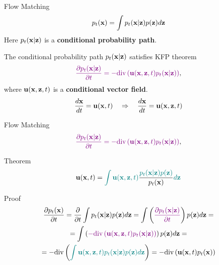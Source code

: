 \begin{frame}{Flow Matching}
	\[
		p_t(\mathbf{x}) = \int p_t(\mathbf{x} | \mathbf{z}) p(\mathbf{z}) d \mathbf{z} 
	\]
	Here $p_t(\mathbf{x} | \mathbf{z})$ is a \textbf{conditional probability path}.
	
	The conditional probability path $p_t(\mathbf{x} | \mathbf{z})$ satisfies KFP theorem
	\[
		{\color{violet}\frac{\partial p_t(\mathbf{x} | \mathbf{z})}{\partial t} = - \text{div}\left(\mathbf{u}(\mathbf{x}, \mathbf{z}, t) p_t(\mathbf{x} | \mathbf{z})\right)},
	\]
	where $\mathbf{u}(\mathbf{x}, \mathbf{z}, t)$ is a \textbf{conditional vector field}.
	\[
		\frac{d\mathbf{x}}{dt} = \mathbf{u}(\mathbf{x}, t) \quad \Rightarrow \quad \frac{d\mathbf{x}}{dt} = \mathbf{u}(\mathbf{x}, \mathbf{z}, t)
	\]
	\vspace{-0.3cm}
\end{frame}
\begin{frame}{Flow Matching}
	\[
		{\color{violet}\frac{\partial p_t(\mathbf{x} | \mathbf{z})}{\partial t} = - \text{div}\left(\mathbf{u}(\mathbf{x}, \mathbf{z}, t) p_t(\mathbf{x} | \mathbf{z})\right)},
	\]
	\begin{block}{Theorem}
		\vspace{-0.3cm}
		\[
			\mathbf{u}(\mathbf{x}, t) = {\color{teal}\int \mathbf{u}(\mathbf{x}, \mathbf{z}, t)} \frac{\color{teal}p_t(\mathbf{x} | \mathbf{z}) p(\mathbf{z})}{p_t(\mathbf{x})} {\color{teal}d \mathbf{z}}
		\]
		\vspace{-0.4cm}
	\end{block}
	\begin{block}{Proof}
		\vspace{-0.5cm}
		\begin{multline*}
			\frac{\partial p_t(\mathbf{x})}{\partial t} = \frac{\partial}{\partial t} \int p_t(\mathbf{x} | \mathbf{z}) p(\mathbf{z}) d \mathbf{z} =  \int \left( {\color{violet} \frac{\partial p_t(\mathbf{x} | \mathbf{z})}{\partial t} } \right) p(\mathbf{z}) d \mathbf{z} = \\
			= \int \left( {\color{violet} - \text{div}\left(\mathbf{u}(\mathbf{x}, \mathbf{z}, t) p_t(\mathbf{x} | \mathbf{z})\right) } \right) p(\mathbf{z}) d \mathbf{z} = \\
			= - \text{div} \left({\color{teal}\int \mathbf{u}(\mathbf{x}, \mathbf{z}, t) p_t(\mathbf{x} | \mathbf{z}) p(\mathbf{z}) d \mathbf{z} }\right) = - \text{div}  \left(\mathbf{u}(\mathbf{x}, t) p_t(\mathbf{x})\right)
		\end{multline*}
	\end{block}
\end{frame}
